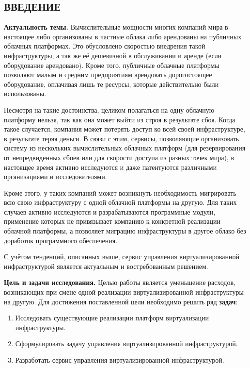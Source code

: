 \begin{center}
\section*{ВВЕДЕНИЕ}
\end{center}
\textbf{Актуальность темы.}
Вычислительные мощности многих компаний мира в настоящее либо организованы в частные облака либо арендованы на публичных облачных платформах. 
Это обусловлено скоростью внедрения такой инфраструктуры, а так же её дешевизной в обслуживании и аренде (если оборудование арендовано).
Кроме того, публичные облачные платформы позволяют малым и средним предприятиям арендовать дорогостоящее оборудование, оплачивая лишь те ресурсы, которые действительно были использованы.

Несмотря на такие достоинства, целиком полагаться на одну облачную платформу нельзя, так как она может выйти из строя в результате сбоя.
Когда такое случается, компания может потерять доступ ко всей своей инфраструктуре, в результате теряя деньги.
В связи с этим, сервисы, позволяющие организовать систему из нескольких вычислительных облачных платформ (для резервирования от непредвиденных сбоев или для скорости доступа из разных точек мира), в настоящее время активно исследуются и даже патентуются различными организациями и исследователями.

Кроме этого, у таких компаний может возникнуть необходимость мигрировать всю свою инфраструктуру с одной облачной платформы на другую.
Для таких случаев активно исследуются и разрабатываются программные модули, применение которых не привязывает компанию к конкретной реализации облачной платформы, а позволяет миграцию инфраструктуры в другое облако без доработок программного обеспечения.

С учётом тенденций, описанных выше, сервис управления виртуализированной инфраструктурой является актуальным и востребованным решением.


\textbf{Цель и задачи исследования.}
Целью работы является уменьшение расходов, возникающих при смене одной реализации виртуализированной инфраструктуры на другую.
Для достижения поставленной цели необходимо решить ряд \textbf{задач}:
\begin{enumerate}
\item Исследовать существующие реализации платформ виртуализации инфраструктуры.
\item Сформулировать задачу управления виртуализированной инфраструктурой.
\item Разработать сервис управления виртуализированной инфраструктурой.
\end{enumerate}

